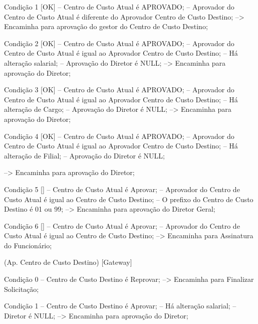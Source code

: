                Condição 1 [OK]
                  -- Centro de Custo Atual é APROVADO;
                  -- Aprovador do Centro de Custo Atual é diferente do Aprovador Centro de Custo Destino;
                     --> Encaminha para aprovação do gestor do Centro de Custo Destino;

               Condição 2 [OK]
                  -- Centro de Custo Atual é APROVADO;
                  -- Aprovador do Centro de Custo Atual é igual ao Aprovador Centro de Custo Destino;
                  -- Há alteração salarial;
                  -- Aprovação do Diretor é NULL;
                     --> Encaminha para aprovação do Diretor;

               Condição 3 [OK]
                  -- Centro de Custo Atual é APROVADO;
                  -- Aprovador do Centro de Custo Atual é igual ao Aprovador Centro de Custo Destino;
                  -- Há alteração de Cargo;
                  -- Aprovação do Diretor é NULL;
                     --> Encaminha para aprovação do Diretor;

               Condição 4 [OK]
                  -- Centro de Custo Atual é APROVADO;
                  -- Aprovador do Centro de Custo Atual é igual ao Aprovador Centro de Custo Destino;
                  -- Há alteração de Filial;
                  -- Aprovação do Diretor é NULL;

                     --> Encaminha para aprovação do Diretor;

               Condição 5 []
                  -- Centro de Custo Atual é Aprovar;
                  -- Aprovador do Centro de Custo Atual é igual ao Centro de Custo Destino;
                  -- O prefixo do Centro de Custo Destino é 01 ou 99;
                     --> Encaminha para aprovação do Diretor Geral;

               Condição 6 []
                  -- Centro de Custo Atual é Aprovar;
                  -- Aprovador do Centro de Custo Atual é igual ao Centro de Custo Destino;
                     --> Encaminha para Assinatura do Funcionário;

               (Ap. Centro de Custo Destino)
                  [Gateway]

                     Condição 0
                        -- Centro de Custo Destino é Reprovar;
                           --> Encaminha para Finalizar Solicitação;

                     Condição 1
                        -- Centro de Custo Destino é Aprovar;
                        -- Há alteração salarial;
                        -- Diretor é NULL;
                           --> Encaminha para aprovação do Diretor;

